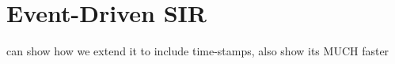 \section{Event-Driven SIR}
\label{sec:eventdriven_sir}

can show how we extend it to include time-stamps, also show its MUCH faster